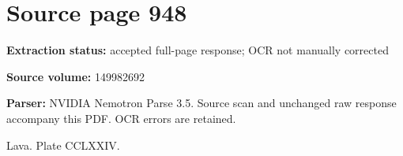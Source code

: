 \clearpage
\section{Source page 948}
\textbf{Extraction status:} accepted full-page response; OCR not manually corrected\par
\textbf{Source volume:} 149982692\par
\textbf{Parser:} NVIDIA Nemotron Parse 3.5. Source scan and unchanged raw response accompany this PDF. OCR errors are retained.\par\medskip
Lava.
Plate CCLXXIV.\par\medskip
